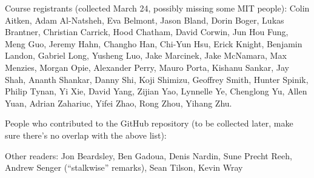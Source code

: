 Course registrants (collected March 24, possibly missing some MIT people): Colin Aitken, Adam Al-Natsheh, Eva Belmont, Jason Bland, Dorin Boger, Lukas Brantner, Christian Carrick, Hood Chatham, David Corwin, Jun Hou Fung, Meng Guo, Jeremy Hahn, Changho Han, Chi-Yun Hsu, Erick Knight, Benjamin Landon, Gabriel Long, Yusheng Luo, Jake Marcinek, Jake McNamara, Max Menzies, Morgan Opie, Alexander Perry, Mauro Porta, Kishanu Sankar, Jay Shah, Ananth Shankar, Danny Shi, Koji Shimizu, Geoffrey Smith, Hunter Spinik, Philip Tynan, Yi Xie, David Yang, Zijian Yao, Lynnelle Ye, Chenglong Yu, Allen Yuan, Adrian Zahariuc, Yifei Zhao, Rong Zhou, Yihang Zhu.

People who contributed to the GitHub repository (to be collected later, make sure there's no overlap with the above list): 

Other readers: Jon Beardsley, Ben Gadoua, Denis Nardin, Sune Precht Reeh, Andrew Senger (``stalkwise'' remarks), Sean Tilson, Kevin Wray

